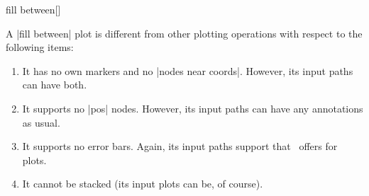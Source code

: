 \begin{addplotoperation}[]{fill between}{[]}
\begin{codeexample}[]
\end{codeexample}
	A |fill between| plot is different from other plotting operations with respect to the following items:
	\begin{enumerate}
		\item It has no own markers and no |nodes near coords|. However, its input paths can have both.
		\item It supports no |pos| nodes. However, its input paths can have any annotations as usual.
		\item It supports no error bars. Again, its input paths support that \PGFPlots\ offers for plots.
		\item It cannot be stacked (its input plots can be, of course).
	\end{enumerate}
\end{addplotoperation}

